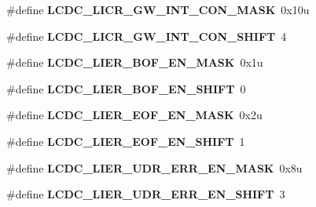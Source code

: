 \begin{DoxyCompactItemize}
\item 
\hypertarget{group___l_c_d_c___register___masks_ga788845664603fb373b00241ae079c6be}{}\#define {\bfseries L\+C\+D\+C\+\_\+\+L\+I\+C\+R\+\_\+\+G\+W\+\_\+\+I\+N\+T\+\_\+\+C\+O\+N\+\_\+\+M\+A\+S\+K}~0x10u\label{group___l_c_d_c___register___masks_ga788845664603fb373b00241ae079c6be}

\item 
\hypertarget{group___l_c_d_c___register___masks_gac256ffe3db6c5e9c071d7b1798fbe0b9}{}\#define {\bfseries L\+C\+D\+C\+\_\+\+L\+I\+C\+R\+\_\+\+G\+W\+\_\+\+I\+N\+T\+\_\+\+C\+O\+N\+\_\+\+S\+H\+I\+F\+T}~4\label{group___l_c_d_c___register___masks_gac256ffe3db6c5e9c071d7b1798fbe0b9}

\item 
\hypertarget{group___l_c_d_c___register___masks_gaeb1315f0a16485c691d41f603e77dc74}{}\#define {\bfseries L\+C\+D\+C\+\_\+\+L\+I\+E\+R\+\_\+\+B\+O\+F\+\_\+\+E\+N\+\_\+\+M\+A\+S\+K}~0x1u\label{group___l_c_d_c___register___masks_gaeb1315f0a16485c691d41f603e77dc74}

\item 
\hypertarget{group___l_c_d_c___register___masks_gae9885f249ec2cd9b5460ff87c6c5a4a6}{}\#define {\bfseries L\+C\+D\+C\+\_\+\+L\+I\+E\+R\+\_\+\+B\+O\+F\+\_\+\+E\+N\+\_\+\+S\+H\+I\+F\+T}~0\label{group___l_c_d_c___register___masks_gae9885f249ec2cd9b5460ff87c6c5a4a6}

\item 
\hypertarget{group___l_c_d_c___register___masks_ga767a2a2015969328f7fb7972333d4dd3}{}\#define {\bfseries L\+C\+D\+C\+\_\+\+L\+I\+E\+R\+\_\+\+E\+O\+F\+\_\+\+E\+N\+\_\+\+M\+A\+S\+K}~0x2u\label{group___l_c_d_c___register___masks_ga767a2a2015969328f7fb7972333d4dd3}

\item 
\hypertarget{group___l_c_d_c___register___masks_ga532788ee259cd2d671748101efe39282}{}\#define {\bfseries L\+C\+D\+C\+\_\+\+L\+I\+E\+R\+\_\+\+E\+O\+F\+\_\+\+E\+N\+\_\+\+S\+H\+I\+F\+T}~1\label{group___l_c_d_c___register___masks_ga532788ee259cd2d671748101efe39282}

\item 
\hypertarget{group___l_c_d_c___register___masks_ga926a8d0325c3eda0cb7aa932c38104cd}{}\#define {\bfseries L\+C\+D\+C\+\_\+\+L\+I\+E\+R\+\_\+\+U\+D\+R\+\_\+\+E\+R\+R\+\_\+\+E\+N\+\_\+\+M\+A\+S\+K}~0x8u\label{group___l_c_d_c___register___masks_ga926a8d0325c3eda0cb7aa932c38104cd}

\item 
\hypertarget{group___l_c_d_c___register___masks_ga27291c99a841ca6aef4ac9e9ffedc4a3}{}\#define {\bfseries L\+C\+D\+C\+\_\+\+L\+I\+E\+R\+\_\+\+U\+D\+R\+\_\+\+E\+R\+R\+\_\+\+E\+N\+\_\+\+S\+H\+I\+F\+T}~3\label{group___l_c_d_c___register___masks_ga27291c99a841ca6aef4ac9e9ffedc4a3}


\end{DoxyCompactItemize}
